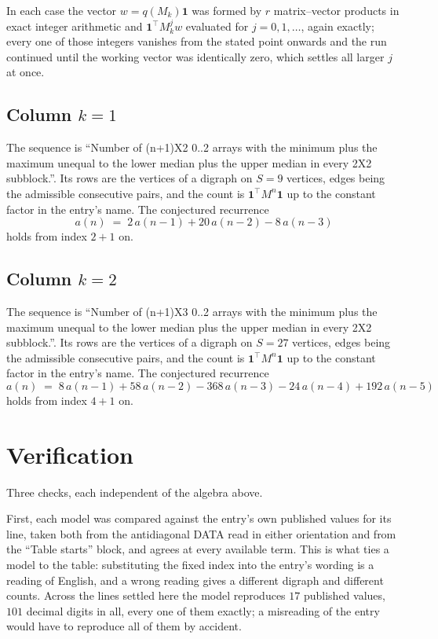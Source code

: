 \documentclass[11pt,a4paper]{article}
\theoremstyle{plain}
\theoremstyle{definition}
\begin{document}
In each case the vector $w=q(M_k)\mathbf{1}$ was formed by $r$ matrix--vector products in
exact integer arithmetic and $\mathbf{1}^{\!\top}M_k^{j}w$ evaluated for $j=0,1,\dots$,
again exactly; every one of those integers vanishes from the stated point onwards and the run
continued until the working vector was identically zero, which settles all larger $j$ at once.

\subsection*{Column $k$$=1$}
The sequence is ``Number of (n+1)X2 0..2 arrays with the minimum plus the maximum unequal to the lower median plus the upper median in every 2X2 subblock.''. Its rows are the vertices of a digraph on
$S=9$ vertices, edges being the admissible consecutive pairs, and the count is
$\mathbf{1}^{\!\top}M^{n}\mathbf{1}$ up to the constant factor in the entry's name.
The conjectured recurrence
\[
a(n)\;=\;2\,a(n-1) + 20\,a(n-2) - 8\,a(n-3)
\]
holds from index $2+1$ on.

\subsection*{Column $k$$=2$}
The sequence is ``Number of (n+1)X3 0..2 arrays with the minimum plus the maximum unequal to the lower median plus the upper median in every 2X2 subblock.''. Its rows are the vertices of a digraph on
$S=27$ vertices, edges being the admissible consecutive pairs, and the count is
$\mathbf{1}^{\!\top}M^{n}\mathbf{1}$ up to the constant factor in the entry's name.
The conjectured recurrence
\[
a(n)\;=\;8\,a(n-1) + 58\,a(n-2) - 368\,a(n-3) - 24\,a(n-4) + 192\,a(n-5)
\]
holds from index $4+1$ on.

\section{Verification}

Three checks, each independent of the algebra above.

First, each model was compared against the entry's own published values for its line, taken
both from the antidiagonal DATA read in either orientation and from the ``Table starts''
block, and agrees at every available term. This is what ties a model to the table:
substituting the fixed index into the entry's wording is a reading of English, and a wrong
reading gives a different digraph and different counts. Across the lines settled here the
model reproduces $17$ published values, $101$ decimal digits in all, every one of
them exactly; a misreading of the entry would have to reproduce all of them by accident.
\end{document}
